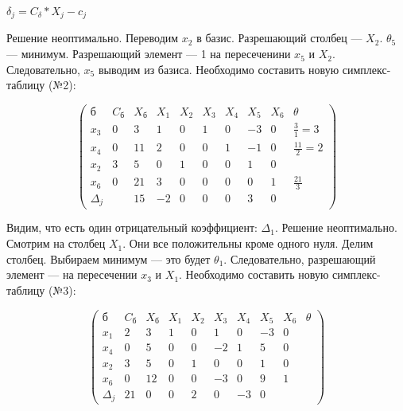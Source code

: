 \documentclass{article}
\begin{document}
$\delta_{j} = C_{\delta} * X_{j} - c_{j}$

Решение неоптимально. Переводим $x_2$ в базис. Разрешающий столбец — $X_{2}$. $\theta_{5}$ — минимум. Разрешающий элемент — 1 на пересеченини $x_5$ и $X_{2}$. Следовательно, $x_5$ выводим из базиса. Необходимо составить новую симплекс-таблицу (№2):

$$
\begin{pmatrix}
    \text{б} & C_{\text{б}} & X_{\text{б}} & X_1 & X_2 & X_3 & X_4 & X_5 & X_6 & \theta \\
    x_3 & 0 & 3 & 1 & 0 & 1 & 0 & -3 & 0 & \frac{3}{1} = 3\\
    x_4 & 0 & 11 & 2 & 0 & 0 & 1 & -1 & 0 & \frac{11}{2} =2\\
    x_2 & 3 & 5 & 0 & 1 & 0 & 0 & 1 & 0 \\
    x_6 & 0 & 21 & 3 & 0 & 0 & 0 & 0 & 1 & \frac{21}{3}\\
    \Delta_{j} & & 15 & -2 & 0 & 0 & 0 & 3 & 0
\end{pmatrix}
$$

Видим, что есть один отрицательный коэффициент: $\Delta_{1}$. Решение неоптимально. Смотрим на столбец $X_{1}$. Они все положительны кроме одного нуля. Делим столбец. Выбираем минимум — это будет $\theta_{1}$. Следовательно, разрешающий элемент — на пересечении $x_3$ и $X_1$. Необходимо составить новую симплекс-таблицу (№3):

$$
\begin{pmatrix}
    \text{б} & C_{\text{б}} & X_{\text{б}} & X_1 & X_2 & X_3 & X_4 & X_5 & X_6 & \theta \\
    x_1 & 2 & 3 & 1 & 0 & 1 & 0 & -3 & 0 \\
    x_4 & 0 & 5 & 0 & 0 & -2 & 1 & 5 & 0 \\ 
    x_2 & 3 & 5 & 0 & 1 & 0 & 0 & 1 & 0 \\
    x_6 & 0 & 12 & 0 & 0 & -3 & 0 & 9 & 1 \\
    \Delta_{j} & 21 & 0 & 0 & 2 & 0 & -3 & 0
\end{pmatrix}
$$
\end{document}
